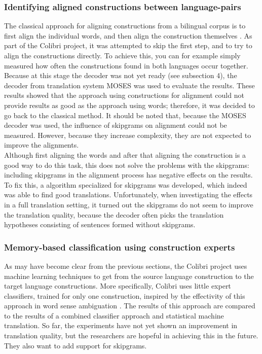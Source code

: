 \documentclass[12pt]{article}
\begin{document}
\subsubsection{Identifying aligned constructions between language-pairs}
The classical approach for aligning constructions from a bilingual corpus is to first align the individual words, and then align the construction themselves \citep{koehn03}. As part of the Colibri project, it was attempted to skip the first step, and to try to align the constructions directly. To achieve this, you can for example simply measured how often the constructions found in both languages occur together.\\\indent
Because at this stage the decoder was not yet ready (see subsection 4), the decoder from translation system MOSES was used to evaluate the results. These results showed that the approach using constructions for alignment could not provide results as good as the approach using words; therefore, it was decided to go back to the classical method. It should be noted that, because the MOSES decoder was used, the influence of skipgrams on alignment could not be measured. However, because they increase complexity, they are not expected to improve the alignments.\\\indent
Although first aligning the words and after that aligning the construction is a good way to do this task, this does not solve the problems with the skipgrams: including skipgrams in the alignment process has negative effects on the results. To fix this, a algorithm specialized for skipgrams was developed, which indeed was able to find good translations. Unfortunately, when investigating the effects in a full translation setting, it turned out the skipgrams do not seem to improve the translation quality, because the decoder often picks the translation hypotheses consisting of sentences formed without skipgrams.

\subsubsection{Memory-based classification using construction experts}
As may have become clear from the previous sections, the Colibri project uses machine learning techniques to get from the source language construction to the target language constructions. More specifically, Colibri uses little expert classifiers, trained for only one construction, inspired by the effectivity of this approach in word sense ambiguation \citep{vangompel10}. The results of this approach are compared to the results of a combined classifier approach and statistical machine translation. So far, the experiments have not yet shown an improvement in translation quality, but the researchers are hopeful in achieving this in the future. They also want to add support for skipgrams.
\end{document}
